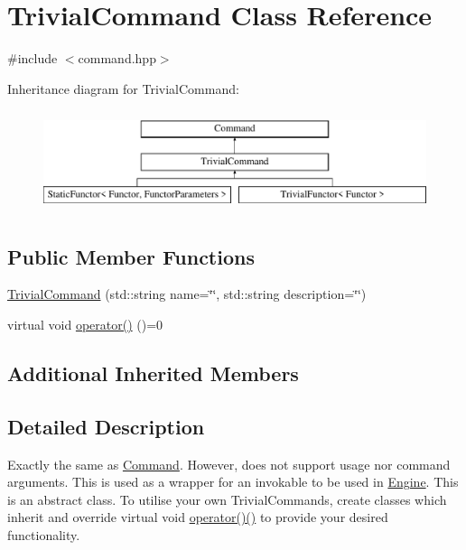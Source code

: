 \hypertarget{class_trivial_command}{}\section{Trivial\+Command Class Reference}
\label{class_trivial_command}


{\ttfamily \#include $<$command.\+hpp$>$}

Inheritance diagram for Trivial\+Command\+:\begin{figure}[H]
\begin{center}
\leavevmode
\includegraphics[height=3.000000cm]{class_trivial_command}
\end{center}
\end{figure}
\subsection*{Public Member Functions}
\begin{DoxyCompactItemize}
\item 
\mbox{\hyperlink{class_trivial_command_aa04f1b1e89d9b70d18abb1979f7a176f}{Trivial\+Command}} (std\+::string name=\char`\"{}\char`\"{}, std\+::string description=\char`\"{}\char`\"{})
\item 
virtual void \mbox{\hyperlink{class_trivial_command_aa61a3e5fd78d3a2dec6fcf6dcb2e5189}{operator()}} ()=0
\end{DoxyCompactItemize}
\subsection*{Additional Inherited Members}


\subsection{Detailed Description}
Exactly the same as \mbox{\hyperlink{class_command}{Command}}. However, does not support \textquotesingle{}usage\textquotesingle{} nor command arguments. This is used as a wrapper for an invokable to be used in \mbox{\hyperlink{class_engine}{Engine}}. This is an abstract class. To utilise your own Trivial\+Commands, create classes which inherit and override virtual void \mbox{\hyperlink{class_trivial_command_aa61a3e5fd78d3a2dec6fcf6dcb2e5189}{operator()()}} to provide your desired functionality. 

